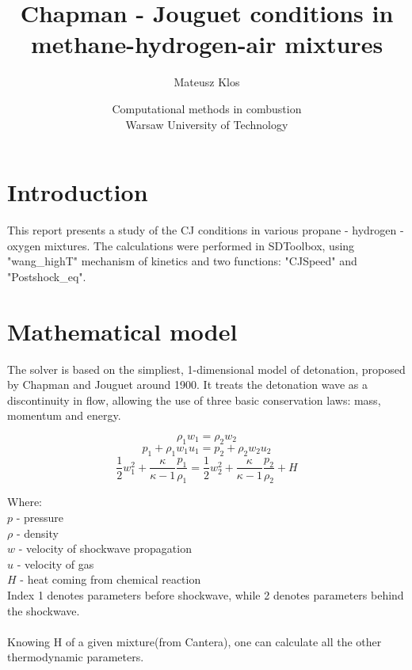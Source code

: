 \documentclass[11pt,a4paper]{article}
\title{Chapman - Jouguet conditions in methane-hydrogen-air mixtures}
\author{Mateusz Klos}
\date{Computational methods in combustion\\
Warsaw University of Technology}
\begin{document}
\maketitle

\clearpage
\tableofcontents
\clearpage
\section{Introduction}\label{sec:intro}
This report presents a study of the CJ conditions in various propane - hydrogen - oxygen mixtures. The calculations were performed in SDToolbox, using "wang\_highT" mechanism of kinetics and two functions: "CJSpeed" and "Postshock\_eq".

\section{Mathematical model}\label{sec:model}
The solver is based on the simpliest, 1-dimensional model of detonation, proposed by Chapman and Jouguet around 1900. It treats the detonation wave as a discontinuity in flow, allowing the use of three basic conservation laws: mass, momentum and energy.

\begin{equation}
    \rho_1 w_1 = \rho_2 w_2
\end{equation}
\begin{equation}
    p_1 + \rho_1 w_1 u_1 =p_2 + \rho_2 w_2 u_2
\end{equation}
\begin{equation}
    \frac{1}{2} w_1^2 + \frac{\kappa}{\kappa - 1} \frac{p_1}{\rho_1} = \frac{1}{2} w_2^2 + \frac{\kappa}{\kappa - 1} \frac{p_2}{\rho_2} + H
\end{equation}

Where:\\
$p$ - pressure\\
$\rho$ - density\\
$w$ - velocity of shockwave propagation\\
$u$ - velocity of gas\\
$H$ - heat coming from chemical reaction\\
Index 1 denotes parameters before shockwave, while 2 denotes parameters behind the shockwave.
\\
\\
Knowing H of a given mixture(from Cantera), one can calculate all the other thermodynamic parameters. 
\end{document}
